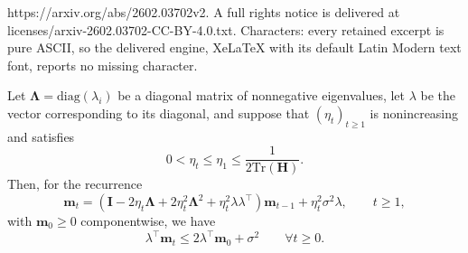 \documentclass[10pt,a4paper]{amsart}
\def\H{{\mathbf{H}}}
\def\I{{\mathbf{I}}}
\def\LLambda{{\mathbf{\Lambda}}}
\def\diag{\text{diag}}
\def\m{{\mathbf{m}}}
\def\tr{\text{Tr}}
\begin{document}
https://arxiv.org/abs/2602.03702v2. A full rights notice is delivered at licenses/arxiv-2602.03702-CC-BY-4.0.txt. Characters: every retained excerpt is pure ASCII, so the delivered engine, XeLaTeX with its default Latin Modern text font, reports no missing character.
\begin{lemma}
    \label{lem:bounded_risk}
    Let $\LLambda = \diag(\lambda_i)$ be a diagonal matrix of
    nonnegative eigenvalues, let $\lambda$ be the vector corresponding
    to its diagonal, and suppose that $(\eta_t)_{t\geq 1}$ is
    nonincreasing and satisfies
    \[
    0 < \eta_t \leq \eta_1 \leq \frac{1}{2 \tr(\H)}.
    \]
    Then, for the recurrence
    \[
    \m_t
    =
    \left(
        \I
        - 2 \eta_t \LLambda
        + 2 \eta_t^2 \LLambda^2
        + \eta_t^2 \lambda \lambda^\top
    \right)\m_{t-1}
    + \eta_t^2 \sigma^2 \lambda,
    \qquad t\geq 1,
    \]
    with $\m_0\geq 0$ componentwise, we have
    \[
    \lambda^\top \m_t
    \leq
    2 \lambda^\top \m_0 + \sigma^2
    \qquad \forall t \geq 0.
    \]
\end{lemma}
\end{document}
